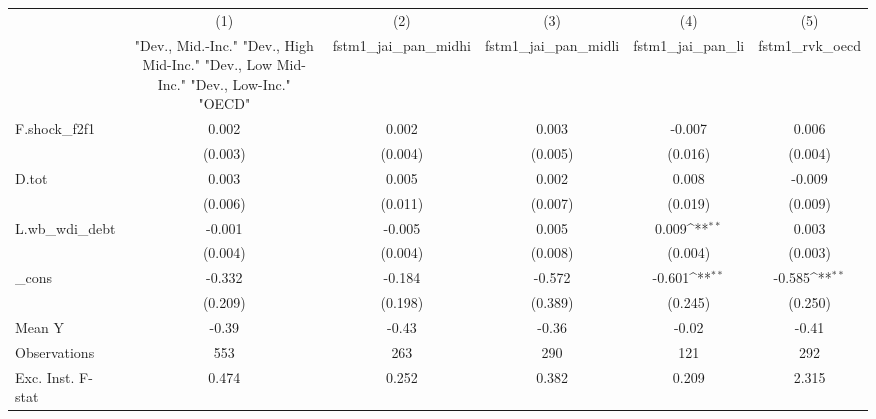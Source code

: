 {
\def\sym#1{\ifmmode^{#1}\else\(^{#1}\)\fi}
\begin{tabular}{l*{5}{c}}
\toprule
            &\multicolumn{1}{c}{(1)}&\multicolumn{1}{c}{(2)}&\multicolumn{1}{c}{(3)}&\multicolumn{1}{c}{(4)}&\multicolumn{1}{c}{(5)}\\
            &\multicolumn{1}{c}{ "Dev., Mid.-Inc." "Dev., High Mid-Inc." "Dev., Low Mid-Inc." "Dev., Low-Inc." "OECD" }&\multicolumn{1}{c}{fstm1\_jai\_pan\_midhi}&\multicolumn{1}{c}{fstm1\_jai\_pan\_midli}&\multicolumn{1}{c}{fstm1\_jai\_pan\_li}&\multicolumn{1}{c}{fstm1\_rvk\_oecd}\\
\midrule
F.shock\_f2f1&       0.002         &       0.002         &       0.003         &      -0.007         &       0.006         \\
            &     (0.003)         &     (0.004)         &     (0.005)         &     (0.016)         &     (0.004)         \\
\addlinespace
D.tot       &       0.003         &       0.005         &       0.002         &       0.008         &      -0.009         \\
            &     (0.006)         &     (0.011)         &     (0.007)         &     (0.019)         &     (0.009)         \\
\addlinespace
L.wb\_wdi\_debt&      -0.001         &      -0.005         &       0.005         &       0.009\sym{**} &       0.003         \\
            &     (0.004)         &     (0.004)         &     (0.008)         &     (0.004)         &     (0.003)         \\
\addlinespace
\_cons      &      -0.332         &      -0.184         &      -0.572         &      -0.601\sym{**} &      -0.585\sym{**} \\
            &     (0.209)         &     (0.198)         &     (0.389)         &     (0.245)         &     (0.250)         \\
\midrule
Mean Y      &       -0.39         &       -0.43         &       -0.36         &       -0.02         &       -0.41         \\
Observations&         553         &         263         &         290         &         121         &         292         \\
Exc. Inst. F-stat&       0.474         &       0.252         &       0.382         &       0.209         &       2.315         \\
\bottomrule
\end{tabular}
}
